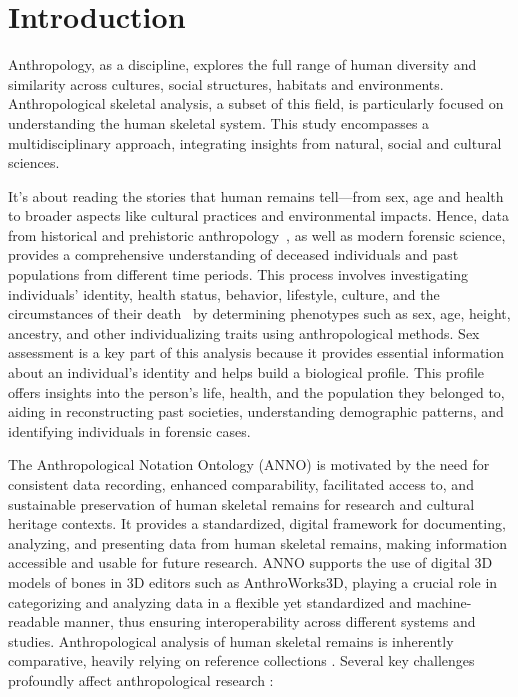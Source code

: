 \documentclass[sw]{iosart2x}
\begin{document}
\section{Introduction}\label{sec:introduction}

Anthropology, as a discipline, explores the full range of human diversity and similarity across cultures, social structures, habitats and environments.
Anthropological skeletal analysis, a subset of this field, is particularly focused on understanding the human skeletal system.
This study encompasses a multidisciplinary approach, integrating insights from natural, social and cultural sciences.

It's about reading the stories that human remains tell---from sex, age and health to broader aspects like cultural practices and environmental impacts.
Hence, data from historical and prehistoric anthropology~\cite{prehistoricanthropology}, as well as modern forensic science, provides a comprehensive understanding of deceased individuals and past populations from different time periods.
This process involves investigating individuals' identity, health status, behavior, lifestyle, culture, and the circumstances of their death~\cite{spurensuche} by determining phenotypes such as sex, age, height, ancestry, and other individualizing traits using anthropological methods.
Sex assessment is a key part of this analysis because it provides essential information about an individual's identity and helps build a biological profile.
This profile offers insights into the person's life, health, and the population they belonged to, aiding in reconstructing past societies, understanding demographic patterns, and identifying individuals in forensic cases.

The Anthropological Notation Ontology (ANNO) is motivated by the need for consistent data recording, enhanced comparability, facilitated access to, and sustainable preservation of human skeletal remains for research and cultural heritage contexts.
It provides a standardized, digital framework for documenting, analyzing, and presenting data from human skeletal remains, making information accessible and usable for future research.
ANNO supports the use of digital 3D models of bones in 3D editors such as AnthroWorks3D, playing a crucial role in categorizing and analyzing data in a flexible yet standardized and machine-readable manner, thus ensuring interoperability across different systems and studies.
Anthropological analysis of human skeletal remains is inherently comparative, heavily relying on reference collections \citep{spurensuche}.
Several key challenges profoundly affect anthropological research \citep{aw3dcidoc}:
\end{document}
